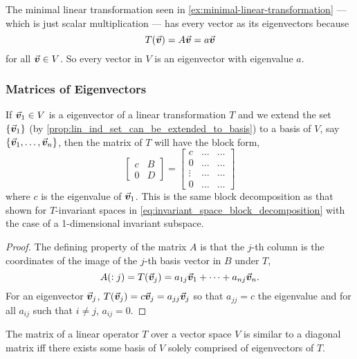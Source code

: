 \documentclass[MathsNotesBase.tex]{subfiles}
\begin{document}
{\begin{exe}
{	 		}
 			\item{The minimal linear transformation seen in \ref{ex:minimal-linear-transformation} --- which is just scalar multiplication --- has every vector as its eigenvectors because
 				\[ T(\vec{\bm{v}}) = A\vec{\bm{v}} = a\vec{\bm{v}} \]
 				for all ${ \vec{\bm{v}} \in V }$. So every vector in $V$ is an eigenvector with eigenvalue $a$.
 			}\label{ex:eigenvectors-of-minimal-linear-transformations}
	 	\end{exe}
 	
 		\bigskip
 		\subsubsection{Matrices of Eigenvectors}
 		\bigskip
 		If ${ \vec{\bm{v}}_1 \in V }$ is a eigenvector of a linear transformation $T$ and we extend the set ${ \{\vec{\bm{v}}_1\} }$ (by \autoref{prop:lin_ind_set_can_be_extended_to_basis}) to a basis of $V$, say ${ \{\vec{\bm{v}}_1,\dots,\vec{\bm{v}}_n\} }$, then the matrix of $T$ will have the block form,
 		\[
 			\begin{bmatrix}
 			c & B\\
 			0 & D
 			\end{bmatrix} =
 			\begin{bmatrix}
 			c & \dots & \dots\\
 			0 & \dots & \dots\\
 			\vdots & \dots & \dots\\
 			0 & \dots & \dots
 			\end{bmatrix}
 		\]
 		where $c$ is the eigenvalue of $\vec{\bm{v}}_1$. This is the same block decomposition as that shown for $T$-invariant spaces in \ref{eq:invariant_space_block_decomposition} with the case of a 1-dimensional invariant subspace.
 		
 		\medskip
 		\begin{proof}
 			The defining property of the matrix $A$ is that the $j$-th column is the coordinates of the image of the $j$-th basis vector in $B$ under $T$,
 			\[ A(:j) = T(\vec{\bm{v}}_j) = a_{1j}\vec{\bm{v}}_1 + \cdots + a_{nj}\vec{\bm{v}}_n. \]
 			For an eigenvector $\vec{\bm{v}}_j$, ${ T(\vec{\bm{v}}_j) = c\vec{\bm{v}}_j = a_{jj}\vec{\bm{v}}_j }$ so that ${ a_{jj} = c }$ the eigenvalue and for all ${ a_{ij} }$ such that ${ i \neq j }$, ${ a_{ij} = 0 }$. 
 		\end{proof}
 		\begin{corollary}
 			\label{coro:diagonal-similar-matrix-iff-exists-basis-of-eigenvectors}
 			The matrix of a linear operator $T$ over a vector space $V$ is similar to a diagonal matrix iff there exists some basis of $V$ solely comprised of eigenvectors of $T$. 
 		\end{corollary}
 	
}
\end{document}
